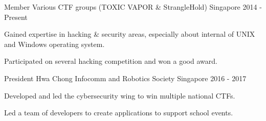 

\begin{cventries}

  \cventry
    {Member} %
    {Various CTF groups (TOXIC VAPOR \& StrangleHold)} %
    {Singapore} %
    {2014 - Present} %
    {
      \begin{cvitems} %
        \item {Gained expertise in hacking \& security areas, especially about internal of UNIX and Windows operating system.}
        \item {Participated on several hacking competition and won a good award.}
      \end{cvitems}
    }

  \cventry
    {President} %
    {Hwa Chong Infocomm and Robotics Society} %
    {Singapore} %
    {2016 - 2017} %
    {
      \begin{cvitems} %
        \item {Developed and led the cybersecurity wing to win multiple national CTFs.}
        \item {Led a team of developers to create applications to support school events.}
      \end{cvitems}
    }

\end{cventries}

